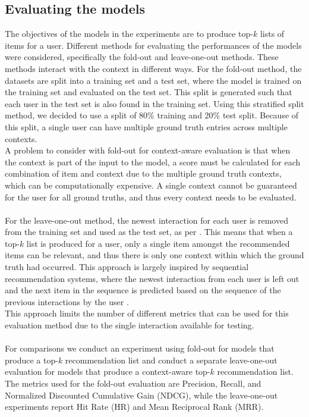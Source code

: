 \subsection{Evaluating the models}\label{subsec:evalandmetrics}
The objectives of the models in the experiments are to produce top-$k$ lists of items for a user. 
Different methods for evaluating the performances of the models were considered, specifically the fold-out and leave-one-out methods.
These methods interact with the context in different ways.
For the fold-out method, the datasets are split into a training set and a test set, where the model is trained on the training set and evaluated on the test set. 
This split is generated such that each user in the test set is also found in the training set.
Using this stratified split method, we decided to use a split of 80\% training and 20\% test split.
Because of this split, a single user can have multiple ground truth entries across multiple contexts.\\
A problem to consider with fold-out for context-aware evaluation is that when the context is part of the input to the model, a score must be calculated for each combination of item and context due to the multiple ground truth contexts, which can be computationally expensive.
A single context cannot be guaranteed for the user for all ground truths, and thus every context needs to be evaluated.
\\\\
For the leave-one-out method, the newest interaction for each user is removed from the training set and used as the test set, as per \cite{CFM, BPR}.
This means that when a top-$k$ list is produced for a user, only a single item amongst the recommended items can be relevant, and thus there is only one context within which the ground truth had occurred.
This approach is largely inspired by sequential recommendation systems, where the newest interaction from each user is left out and the next item in the sequence is predicted based on the sequence of the previous interactions by the user \cite{aggarwal2016recommender}.\\
This approach limits the number of different metrics that can be used for this evaluation method due to the single interaction available for testing.
\\\\
For comparisons we conduct an experiment using fold-out for models that produce a top-$k$ recommendation list and conduct a separate leave-one-out evaluation for models that produce a context-aware top-$k$ recommendation list. 
The metrics used for the fold-out evaluation are Precision, Recall, and Normalized Discounted Cumulative Gain (NDCG), while the leave-one-out experiments report Hit Rate (HR) and Mean Reciprocal Rank (MRR).

